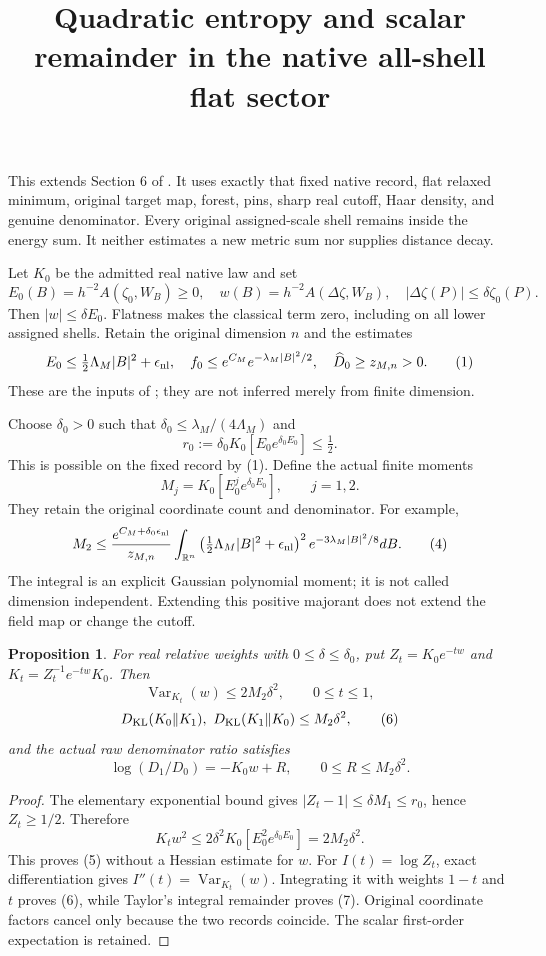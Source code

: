 \documentclass{article}
\title{Quadratic entropy and scalar remainder in the native all-shell flat sector}\author{}\date{}
\newtheorem{proposition}{Proposition}
\begin{document}
\maketitle
This extends Section 6 of \cite{ND}. It uses exactly that fixed native record, flat relaxed minimum, original target map, forest, pins, sharp real cutoff, Haar density, and genuine denominator. Every original assigned-scale shell remains inside the energy sum. It neither estimates a new metric sum nor supplies distance decay.

Let $K_0$ be the admitted real native law and set
\[
 E_0(B)=h^{-2}A(\zeta_0,W_B)\geq0,\quad
 w(B)=h^{-2}A(\Delta\zeta,W_B),\quad
 |\Delta\zeta(P)|\leq\delta\zeta_0(P).
\]
Then $|w|\leq\delta E_0$. Flatness makes the classical term zero, including on all lower assigned shells. Retain the original dimension $n$ and the estimates
\[
 E_0\leq\tfrac12\Lambda_M|B|^2+\epsilon_{\rm nl},\quad
 f_0\leq e^{C_M}e^{-\lambda_M|B|^2/2},\quad
 \widehat D_0\geq z_{M,n}>0.
 \tag{1}
\]
These are the inputs of \cite[Section 6]{ND}; they are not inferred merely from finite dimension.

Choose $\delta_0>0$ such that $\delta_0\leq\lambda_M/(4\Lambda_M)$ and
\[
 r_0:=\delta_0K_0[E_0e^{\delta_0E_0}]\leq\tfrac12.
 \tag{2}
\]
This is possible on the fixed record by (1). Define the actual finite moments
\[
 M_j=K_0[E_0^je^{\delta_0E_0}],\qquad j=1,2.
 \tag{3}
\]
They retain the original coordinate count and denominator. For example,
\[
 M_2\leq\frac{e^{C_M+\delta_0\epsilon_{\rm nl}}}{z_{M,n}}
 \int_{\mathbb R^n}\left(\tfrac12\Lambda_M|B|^2+\epsilon_{\rm nl}\right)^2
 e^{-3\lambda_M|B|^2/8}dB.
 \tag{4}
\]
The integral is an explicit Gaussian polynomial moment; it is not called dimension independent. Extending this positive majorant does not extend the field map or change the cutoff.

\begin{proposition}
For real relative weights with $0\leq\delta\leq\delta_0$, put
$Z_t=K_0e^{-tw}$ and $K_t=Z_t^{-1}e^{-tw}K_0$. Then
\[
 \operatorname{Var}_{K_t}(w)\leq 2M_2\delta^2,\qquad0\leq t\leq1,
 \tag{5}
\]
\[
 D_{\rm KL}(K_0\Vert K_1),\ D_{\rm KL}(K_1\Vert K_0)
 \leq M_2\delta^2,
 \tag{6}
\]
and the actual raw denominator ratio satisfies
\[
 \log(D_1/D_0)=-K_0w+R,\qquad0\leq R\leq M_2\delta^2.
 \tag{7}
\]
\end{proposition}
\begin{proof}
The elementary exponential bound gives $|Z_t-1|\leq\delta M_1\leq r_0$, hence $Z_t\geq1/2$. Therefore
\[
 K_tw^2\leq2\delta^2K_0[E_0^2e^{\delta_0E_0}]=2M_2\delta^2.
\]
This proves (5) without a Hessian estimate for $w$. For $I(t)=\log Z_t$, exact differentiation gives $I''(t)=\operatorname{Var}_{K_t}(w)$. Integrating it with weights $1-t$ and $t$ proves (6), while Taylor's integral remainder proves (7). Original coordinate factors cancel only because the two records coincide. The scalar first-order expectation is retained.
\end{proof}
\end{document}
